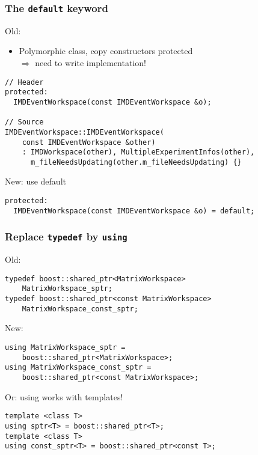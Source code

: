 \documentclass[english]{beamer}
\begin{document}
\begin{frame}[fragile]
    \frametitle{The \texttt{default} keyword}
Old:
\begin{itemize}
    \item Polymorphic class, copy constructors protected\\
        $\Rightarrow$ need to write implementation!
\end{itemize}
\begin{lstlisting}
// Header
protected:
  IMDEventWorkspace(const IMDEventWorkspace &o);

// Source
IMDEventWorkspace::IMDEventWorkspace(
    const IMDEventWorkspace &other)
    : IMDWorkspace(other), MultipleExperimentInfos(other),
      m_fileNeedsUpdating(other.m_fileNeedsUpdating) {}
\end{lstlisting}
New: use \alert{default}
\begin{lstlisting}
protected:
  IMDEventWorkspace(const IMDEventWorkspace &o) = default;
\end{lstlisting}
\end{frame}



\begin{frame}[fragile]
    \frametitle{Replace \texttt{typedef} by \texttt{using}}
Old:
\begin{lstlisting}
typedef boost::shared_ptr<MatrixWorkspace>
    MatrixWorkspace_sptr;
typedef boost::shared_ptr<const MatrixWorkspace>
    MatrixWorkspace_const_sptr;
\end{lstlisting}
\pause
New:
\begin{lstlisting}
using MatrixWorkspace_sptr =
    boost::shared_ptr<MatrixWorkspace>;
using MatrixWorkspace_const_sptr =
    boost::shared_ptr<const MatrixWorkspace>;
\end{lstlisting}
\pause
Or: \alert{using} works with templates!
\begin{lstlisting}
template <class T>
using sptr<T> = boost::shared_ptr<T>;
template <class T>
using const_sptr<T> = boost::shared_ptr<const T>;
\end{lstlisting}
\end{frame}
\end{document}
